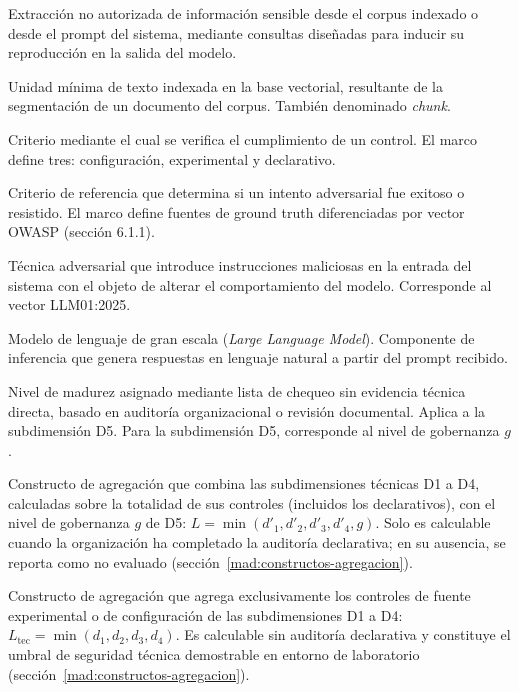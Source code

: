 \begin{description}[leftmargin=0pt, style=nextline]
  \item[Exfiltración] Extracción no autorizada de información sensible desde el corpus indexado o desde el prompt del sistema, mediante consultas diseñadas para inducir su reproducción en la salida del modelo.

  \item[Fragmento] Unidad mínima de texto indexada en la base vectorial, resultante de la segmentación de un documento del corpus. También denominado \emph{chunk}.

  \item[Fuente de evidencia] Criterio mediante el cual se verifica el cumplimiento de un control. El marco define tres: configuración, experimental y declarativo.

  \item[Ground truth] Criterio de referencia que determina si un intento adversarial fue exitoso o resistido. El marco define fuentes de ground truth diferenciadas por vector OWASP (sección 6.1.1).

  \item[Inyección de prompt] Técnica adversarial que introduce instrucciones maliciosas en la entrada del sistema con el objeto de alterar el comportamiento del modelo. Corresponde al vector LLM01:2025.

  \item[LLM] Modelo de lenguaje de gran escala (\emph{Large Language Model}). Componente de inferencia que genera respuestas en lenguaje natural a partir del prompt recibido.

  \item[Nivel declarado] Nivel de madurez asignado mediante lista de chequeo sin evidencia técnica directa, basado en auditoría organizacional o revisión documental. Aplica a la subdimensión D5. Para la subdimensión D5, corresponde al nivel de gobernanza $g$.

  \item[Nivel integral] Constructo de agregación que combina las subdimensiones técnicas D1 a D4, calculadas sobre la totalidad de sus controles (incluidos los declarativos), con el nivel de gobernanza $g$ de D5: $L = \min(d'_1, d'_2, d'_3, d'_4, g)$. Solo es calculable cuando la organización ha completado la auditoría declarativa; en su ausencia, se reporta como no evaluado (sección~\ref{mad:constructos-agregacion}).

  \item[Nivel técnico verificado] Constructo de agregación que agrega exclusivamente los controles de fuente experimental o de configuración de las subdimensiones D1 a D4: $L_{\text{tec}} = \min(d_1, d_2, d_3, d_4)$. Es calculable sin auditoría declarativa y constituye el umbral de seguridad técnica demostrable en entorno de laboratorio (sección~\ref{mad:constructos-agregacion}).


\end{description}
